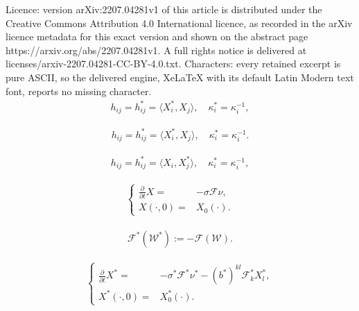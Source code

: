 \documentclass[10pt,a4paper]{amsart}
\newcommand{\s}{\sigma}
\renewcommand{\k}{\kappa}
\begin{document}
Licence: version arXiv:2207.04281v1 of this article is distributed under the Creative Commons Attribution 4.0 International licence, as recorded in the arXiv licence metadata for this exact version and shown on the abstract page https://arxiv.org/abs/2207.04281v1. A full rights notice is delivered at licenses/arxiv-2207.04281-CC-BY-4.0.txt. Characters: every retained excerpt is pure ASCII, so the delivered engine, XeLaTeX with its default Latin Modern text font, reports no missing character.
	\begin{align}\label{s2:duality-sphere}
	h_{ij}=h^\ast_{ij}=\langle X^\ast_i,X_j\rangle, \quad \k_i^\ast=\k_i^{-1},
	\end{align}

	\begin{align}\label{s2:duality-hyperbolic}
	h_{ij}=h^\ast_{ij}=\langle X^\ast_i,X_j\rangle, \quad \k_i^\ast=\k_i^{-1}.
	\end{align}

	\begin{align}\label{s2:duality-deSitter}
	h_{ij} =h^\ast_{ij}=\langle X_i,X^\ast_j\rangle, \quad 	\k^\ast_i=\k_i^{-1},
	\end{align}	

\begin{align}\label{s2:curvature-flow}
\left\{
\begin{aligned}
\frac{\partial}{\partial t}X=&-\s \mathcal{F}\nu, \\
X(\cdot,0)=&X_0(\cdot).
\end{aligned}\right.
\end{align}

\begin{align}\label{s2:dual-function}
\mathcal{F}^\ast(\mathcal{W}^\ast):=-\mathcal{F}(\mathcal{W}).
\end{align}

\begin{align}\label{s2:dual-flow}
\left\{
\begin{aligned}
\frac{\partial}{\partial t}X^\ast=&-\s^{\ast} \mathcal{F}^\ast \nu^\ast-(b^\ast)^{kl}\mathcal{F}^\ast_{k}X^\ast_l, \\
X^\ast(\cdot,0)=&X^\ast_0(\cdot).
\end{aligned}\right.
\end{align}
\end{document}
